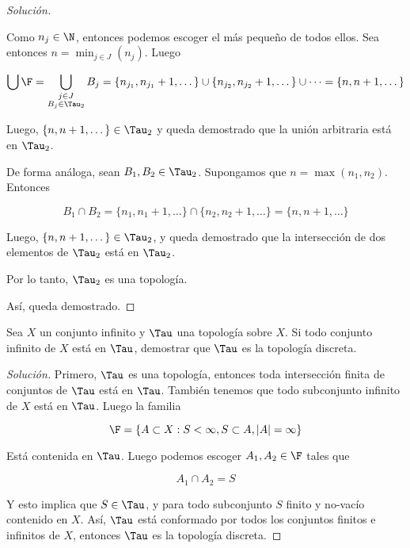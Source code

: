 \begin{proof}[Solución]
\begin{enumerate}
        Como $n_j \in \N$, entonces podemos escoger el más pequeño de todos ellos. Sea entonces $n = \min_{j \in J} (n_j)$. Luego
        
        \[
        \bigcup \F = \bigcup_{\substack{j \in J \\ B_j \in \Tau_2}} B_j = \{n_{j_1}, n_{j_1}+1, \dots \} \cup \{n_{j_2}, n_{j_2}+1, \dots \} \cup \dots = \{n, n+1, \dots\}
        \]
        
        Luego, $\{n, n+1, \dots\} \in \Tau_2$ y queda demostrado que la unión arbitraria está en $\Tau_2$.
        
        De forma análoga, sean $B_1, B_2 \in \Tau_2$. Supongamos que $n = \max (n_1, n_2)$. Entonces
        
        \[
        B_1 \cap B_2 = \{n_{1}, n_{1}+1, \dots \} \cap \{n_{2}, n_{2}+1, \dots \} = \{n, n+1, \dots\}
        \]
        
        Luego, $\{n, n+1, \dots\} \in \Tau_2$, y queda demostrado que la intersección de dos elementos de $\Tau_2$ está en $\Tau_2$.
        
        Por lo tanto, $\Tau_2$ es una topología.
    \end{enumerate}
    
    Así, queda demostrado.
\end{proof}

\begin{ejer}
    Sea $X$ un conjunto infinito y $\Tau$ una topología sobre $X$. Si todo conjunto infinito de $X$ está en $\Tau$, demostrar que $\Tau$ es la topología discreta.
\end{ejer}

\begin{proof}[Solución]
    Primero, $\Tau$ es una topología, entonces toda intersección finita de conjuntos de $\Tau$ está en $\Tau$. También tenemos que todo subconjunto infinito de $X$ está en $\Tau$. Luego la familia
    
    \[
    \F = \{A \subset X : S < \infty, S \subset A, |A| = \infty\}
    \]
    
    Está contenida en $\Tau$. Luego podemos escoger $A_1, A_2 \in \F$ tales que
    
    \[
    A_1 \cap A_2 = S
    \]
    
    Y esto implica que $S \in \Tau$, y para todo subconjunto $S$ finito y no-vacío contenido en $X$. Así, $\Tau$ está conformado por todos los conjuntos finitos e infinitos de $X$, entonces $\Tau$ es la topología discreta.
\end{proof}

